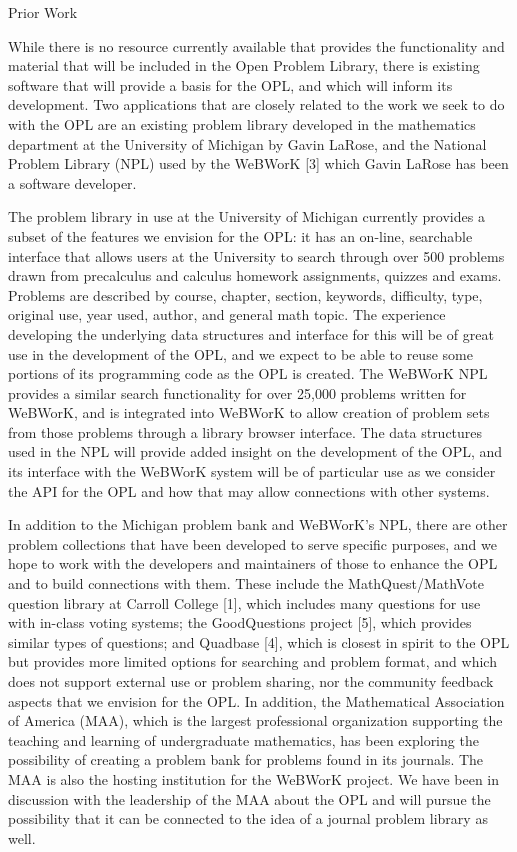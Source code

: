 \documentclass[11pt]{article}
\begin{document}
\begin{section}{Prior Work}

While there is no resource currently available that provides the
functionality and material that will be included in the Open Problem
Library, there is existing software that will provide a basis for the OPL,
and which will inform its development.  Two applications that are closely
related to the work we seek to do with the OPL are an existing problem
library developed in the mathematics department at the University of
Michigan by Gavin LaRose, and the National Problem Library (NPL) used by
the WeBWorK [3] %
which Gavin LaRose has been a software developer.

The problem library in use at the University of Michigan currently
provides a subset of the features we envision for the OPL: it has an
on-line, searchable interface that allows users at the University to
search through over 500 problems drawn from precalculus and calculus
homework assignments, quizzes and exams.  Problems are described by
course, chapter, section, keywords, difficulty, type, original use, year
used, author, and general math topic.  The experience developing the
underlying data structures and interface for this will be of great use in
the development of the OPL, and we expect to be able to reuse some
portions of its programming code as the OPL is created.  The WeBWorK NPL
provides a similar search functionality for over 25,000 problems written
for WeBWorK, and is integrated into WeBWorK to allow creation of problem
sets from those problems through a library browser interface.  The data
structures used in the NPL will provide added insight on the development
of the OPL, and its interface with the WeBWorK system will be of
particular use as we consider the API for the OPL and how that may allow
connections with other systems.

In addition to the Michigan problem bank and WeBWorK's NPL, there are
other problem collections that have been developed to serve specific
purposes, and we hope to work with the developers and maintainers of those
to enhance the OPL and to build connections with them.  These include the
MathQuest/MathVote question library at Carroll College [1], %
which includes many questions for use with in-class voting systems; the
GoodQuestions project [5], %
which provides similar types of
questions; and Quadbase [4], %
which is closest in spirit to the
OPL but provides more limited options for searching and problem format,
and which does not support external use or problem sharing, nor the
community feedback aspects that we envision for the OPL.  In addition, the
Mathematical Association of America (MAA), which is the largest
professional organization supporting the teaching and learning of
undergraduate mathematics, has been exploring the possibility of creating
a problem bank for problems found in its journals.  The MAA is also the
hosting institution for the WeBWorK project.  We have been in discussion
with the leadership of the MAA about the OPL and will pursue the
possibility that it can be connected to the idea of a journal problem
library as well.


\end{section}
\end{document}
